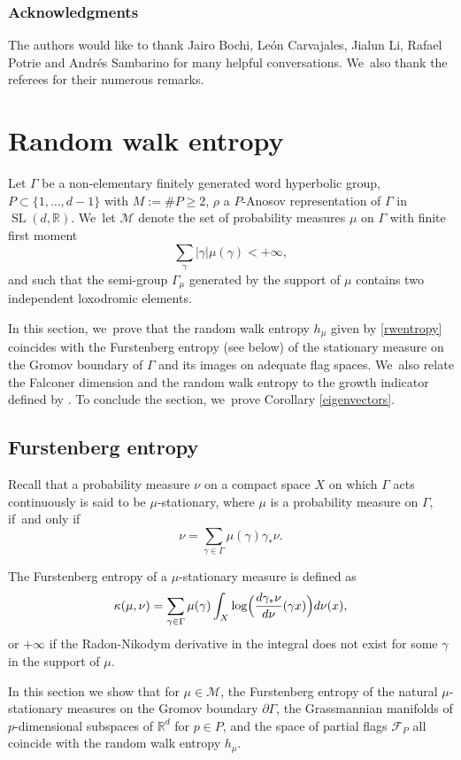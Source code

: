 \documentclass[10pt]{amsart}
\newcommand{\R}{\mathbb{R}}
\newcommand{\F}{\mathcal{F}}
\newcommand{\M}{\mathcal M}
\let\G\Gamma
\let\g\gamma
\DeclareMathOperator{\SL}{SL}
\begin{document}
\subsubsection*{Acknowledgments}
The authors would like to thank Jairo Bochi, León Carvajales, Jialun Li, Rafael Potrie and Andrés Sambarino for many helpful conversations. We~also thank the referees for their numerous remarks.

\section{Random walk entropy}

Let \(\G\) be a non-elementary finitely generated word hyperbolic group, \(P \subset \lbrace 1,\ldots, d-1 \rbrace\) with \(M:= \#P \ge 2 \), \(\rho \) a \(P\)-Anosov representation of \(\G\) in \(\SL (d,\R) \). We~let \(\mathcal{M}\) denote the set of probability measures \(\mu\) on \(\Gamma\) with finite first moment
\[
\sum_{\gamma} |\gamma| \mu(\gamma) < +\infty,
\]
and such that the semi-group \(\Gamma_\mu\) generated by the support of \(\mu\) contains two independent loxodromic elements.

In this section, we~prove that the random walk entropy \(h_\mu \) given by \eqref{rwentropy} coincides with the Furstenberg entropy (see below) of the stationary measure on the Gromov boundary of \(\Gamma\) and its images on adequate flag spaces. We~also relate the Falconer dimension and the random walk entropy to the growth indicator defined by \cite{Qui02a}. To conclude the section, we~prove Corollary \ref{eigenvectors}.

\subsection{Furstenberg entropy}

Recall that a probability measure \(\nu\) on a compact space \(X\) on which \(\Gamma\) acts continuously is said to be \(\mu\)-stationary, where \(\mu\) is a probability measure on \(\Gamma\), if~and only if
\[
\nu = \sum_{\gamma \in \Gamma}\mu(\gamma)\gamma_*\nu.
\]

The Furstenberg entropy of a \(\mu\)-stationary measure is defined as
\[
\kappa(\mu,\nu) = \sum_{\gamma \in \Gamma} \mu(\gamma) \int_{X} \log\Bigl(\frac{d\gamma_*\nu}{d\nu}(\g x)\Bigr)d\nu(x),
\]
or \(+\infty\) if the Radon-Nikodym derivative in the integral does not exist for some \(\gamma\) in the support of \(\mu\).

In this section we show that for \(\mu \in \M\), the Furstenberg entropy of the natural \(\mu\)-stationary measures on the Gromov boundary \(\partial\Gamma\), the Grassmannian manifolds of \(p\)-dimensional subspaces of \(\R^d\) for \(p \in P\), and the space of partial flags \(\F_P\) all coincide with the random walk entropy \(h_\mu\).
\end{document}
